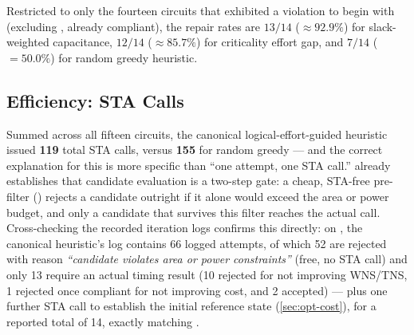 Restricted to only the fourteen circuits that exhibited a violation to
begin with (excluding , already compliant), the repair rates are
$13/14$ ($\approx 92.9\%$) for slack-weighted capacitance, $12/14$
($\approx 85.7\%$) for criticality effort gap, and $7/14$ ($=50.0\%$) for
random greedy heuristic.

\subsection{Efficiency: STA Calls}
\label{sec:res-efficiency}

Summed across all fifteen circuits, the canonical logical-effort-guided
heuristic issued \textbf{119} total STA calls, versus \textbf{155} for
random greedy --- and the correct explanation for this is more specific
than ``one attempt, one STA call.''  already
establishes that candidate evaluation is a two-step gate: a cheap,
STA-free pre-filter () rejects a
candidate outright if it alone would exceed the area or power budget,
and only a candidate that survives this filter reaches the actual
 call. Cross-checking the recorded iteration logs
confirms this directly: on , the
canonical heuristic's log contains 66 logged attempts, of which 52 are
rejected with reason \emph{``candidate violates area or power
constraints''} (free, no STA call) and only 13 require an actual timing
result (10 rejected for not improving WNS/TNS, 1 rejected once compliant
for not improving cost, and 2 accepted) --- plus one further STA call to
establish the initial reference state (\cref{sec:opt-cost}), for a
reported total of 14, exactly matching .

